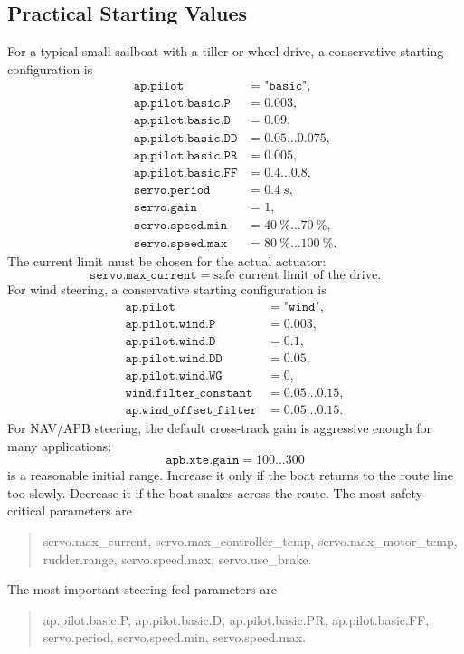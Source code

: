 \documentclass[11pt,twocolumn]{article}
\begin{document}
\subsection{Practical Starting Values}
For a typical small sailboat with a tiller or wheel drive, a conservative
starting configuration is
\[
\begin{array}{ll}
\texttt{ap.pilot} &= \texttt{"basic"},\\
\texttt{ap.pilot.basic.P} &= \num{0.003},\\
\texttt{ap.pilot.basic.D} &= \num{0.09},\\
\texttt{ap.pilot.basic.DD} &= \num{0.05}\ldots\num{0.075},\\
\texttt{ap.pilot.basic.PR} &= \num{0.005},\\
\texttt{ap.pilot.basic.FF} &= \num{0.4}\ldots\num{0.8},\\
\texttt{servo.period} &= \SI{0.4}{s},\\
\texttt{servo.gain} &= \num{1},\\
\texttt{servo.speed.min} &= \SI{40}{\percent}\ldots\SI{70}{\percent},\\
\texttt{servo.speed.max} &= \SI{80}{\percent}\ldots\SI{100}{\percent}.
\end{array}
\]
The current limit must be chosen for the actual actuator:
\[
\texttt{servo.max\_current}
=
\text{safe current limit of the drive}.
\]
For wind steering, a conservative starting configuration is
\[
\begin{array}{ll}
\texttt{ap.pilot} &= \texttt{"wind"},\\
\texttt{ap.pilot.wind.P} &= \num{0.003},\\
\texttt{ap.pilot.wind.D} &= \num{0.1},\\
\texttt{ap.pilot.wind.DD} &= \num{0.05},\\
\texttt{ap.pilot.wind.WG} &= \num{0},\\
\texttt{wind.filter\_constant} &= \num{0.05}\ldots\num{0.15},\\
\texttt{ap.wind\_offset\_filter} &= \num{0.05}\ldots\num{0.15}.
\end{array}
\]
For NAV/APB steering, the default cross-track gain is aggressive enough
for many applications:
\[
\texttt{apb.xte.gain}
=
\num{100}\ldots\num{300}
\]
is a reasonable initial range.  Increase it only if the boat returns to
the route line too slowly.  Decrease it if the boat snakes across the
route.
The most safety-critical parameters are
\begin{quote}
\scriptsize\ttfamily
servo.max\_current, servo.max\_controller\_temp, servo.max\_motor\_temp,
rudder.range, servo.speed.max, servo.use\_brake.
\end{quote}
The most important steering-feel parameters are
\begin{quote}
\scriptsize\ttfamily
ap.pilot.basic.P, ap.pilot.basic.D, ap.pilot.basic.PR, ap.pilot.basic.FF,
servo.period, servo.speed.min, servo.speed.max.
\end{quote}
\end{document}
